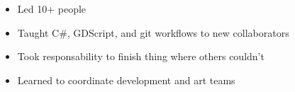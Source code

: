 \documentclass[10pt,a4paper,ragged2e,withhyper]{altacv}
\begin{document}
\begin{paracol}{2}
		\begin{itemize}
			\item Led 10+ people
			\item Taught C\#, GDScript, and git workflows to new collaborators
			\item Took responsability to finish thing where others couldn't
			\item Learned to coordinate development and art teams
		\end{itemize}
		
		
		
		\newpage
		
		\switchcolumn
		
		\CVTagCSharp
		\CVTagC
		\CVTagCPlusPlus
		\CVTagGDScript
		\CVTagHTMLCSS
		\CVTagJava \\ %
		\CVTagJSNode
		\CVTagLaTeX
		\CVTagLua
		\CVTagPython
		\CVTagRuby \\ %
		\CVTagScala
		\CVTagSQL
		\CVTagTypeScript
		
		\CVTagCodeMirrorJs
		\CVTagdatGUI %
		\CVTagExpress
		\CVTagGulp
		\CVTagPFiveJS \\ %
		\CVTagPostCSS
		\CVTagReactNative
		\CVTagReact
		\CVTagRollup
		\CVTagSCSSSass
		\CVTagSnowpack
		\CVTagSolidJS
		\CVTagStylus
		\CVTagWebpack \\ %
		\CVTagNUnit %
		\CVTagOCRA %
		\CVTagMySQL %
		\CVTagMongoDB \\ %
		\CVTagDefold %
		\CVTagGodot
		\CVTagPhaser
		\CVTagUnity
		\CVTagUE
		
		
		
		

\end{paracol}
\end{document}
